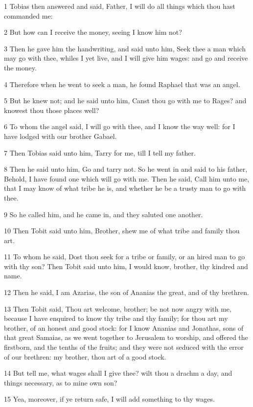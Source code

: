\par 1 Tobias then answered and said, Father, I will do all things which thou hast commanded me:
\par 2 But how can I receive the money, seeing I know him not?
\par 3 Then he gave him the handwriting, and said unto him, Seek thee a man which may go with thee, whiles I yet live, and I will give him wages: and go and receive the money.
\par 4 Therefore when he went to seek a man, he found Raphael that was an angel.
\par 5 But he knew not; and he said unto him, Canst thou go with me to Rages? and knowest thou those places well?
\par 6 To whom the angel said, I will go with thee, and I know the way well: for I have lodged with our brother Gabael.
\par 7 Then Tobias said unto him, Tarry for me, till I tell my father.
\par 8 Then he said unto him, Go and tarry not. So he went in and said to his father, Behold, I have found one which will go with me. Then he said, Call him unto me, that I may know of what tribe he is, and whether he be a trusty man to go with thee.
\par 9 So he called him, and he came in, and they saluted one another.
\par 10 Then Tobit said unto him, Brother, shew me of what tribe and family thou art.
\par 11 To whom he said, Dost thou seek for a tribe or family, or an hired man to go with thy son? Then Tobit said unto him, I would know, brother, thy kindred and name.
\par 12 Then he said, I am Azarias, the son of Ananias the great, and of thy brethren.
\par 13 Then Tobit said, Thou art welcome, brother; be not now angry with me, because I have enquired to know thy tribe and thy family; for thou art my brother, of an honest and good stock: for I know Ananias and Jonathas, sons of that great Samaias, as we went together to Jerusalem to worship, and offered the firstborn, and the tenths of the fruits; and they were not seduced with the error of our brethren: my brother, thou art of a good stock.
\par 14 But tell me, what wages shall I give thee? wilt thou a drachm a day, and things necessary, as to mine own son?
\par 15 Yea, moreover, if ye return safe, I will add something to thy wages.
